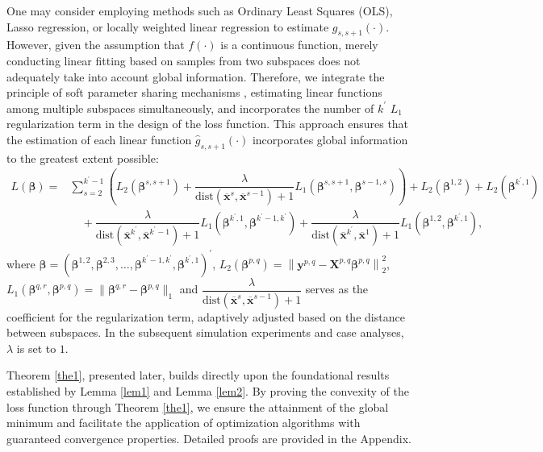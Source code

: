 \documentclass[final,3p,times]{elsarticle}
\begin{document}
One may consider employing methods such as Ordinary Least Squares 
(OLS), Lasso regression, or locally weighted linear regression to 
estimate $g_{s,s+1}(\cdot)$. 
However, given the assumption that $f(\cdot)$ is a continuous 
function, merely conducting linear fitting based on samples from 
two subspaces does not adequately take into account global 
information. Therefore, we integrate the principle of soft 
parameter sharing mechanisms \cite{bib70}, estimating linear functions 
among multiple subspaces simultaneously, and incorporates the number of $k^\prime$ 
$L_1$ regularization term in the design of the loss function. This approach ensures that the estimation of each linear function 
$\hat{g}_{s,s+1}(\cdot)$ incorporates global information to the 
greatest extent possible:
\begin{equation} 
\label{eq8}
\begin{aligned}
L(\boldsymbol{\beta})=
&\sum\limits_{s=2}^{k^\prime-1}
\left(L_2(\boldsymbol{\beta}^{s,s+1})+\dfrac{\lambda}
{\text{dist}(\overline{\boldsymbol{x}}^{s},
\overline{\boldsymbol{x}}^{s-1})+1} 
L_1(\boldsymbol
{\beta}^{s,s+1},\boldsymbol{\beta}^{s-1,s}) \right) 
+L_2(\boldsymbol{\beta}^{1,2})+L_2(\boldsymbol{\beta}
^{k^\prime,1}) \\
&\quad+\dfrac{\lambda}{\text{dist}(
  \overline{\boldsymbol{x}}^{k^\prime},\overline
  {\boldsymbol{x}}^{k^\prime-1})+1}L_1(\boldsymbol{\beta}^{k^\prime,1},
  \boldsymbol{\beta}^{k^\prime-1,k^\prime})+\dfrac{\lambda}{\text{dist}(
\overline{\boldsymbol{x}}^{k^\prime},\overline
{\boldsymbol{x}}^{1})+1}L_1(\boldsymbol{\beta}^{1,2},
\boldsymbol{\beta}^{k^\prime,1}), 
\end{aligned}
\end{equation}
where $\boldsymbol{\beta}=\left(\boldsymbol{\beta}
^{1,2},\boldsymbol{\beta}^{2,3},\ldots,\boldsymbol
{\beta}^{k^\prime-1,k^\prime},\boldsymbol{\beta}^
{k^\prime,1}\right)^\prime$, $L_2(\boldsymbol{\beta}
^{p,q})=\left\|\boldsymbol{y}^{p, q}-\boldsymbol{X}^{p, q} 
\boldsymbol{\beta}^{p, q}\right\|_{2}^{2}$, 
$L_1(\boldsymbol{\beta}^{q,r},\boldsymbol{\beta}^
{p,q})=\|\boldsymbol{\beta}^{q,r}-\boldsymbol{\beta}
^{p,q}\|_1$ and $\dfrac{\lambda}{\text{dist}(
\overline{\boldsymbol{x}}^{s},\overline{\boldsymbol{x}}
^{s-1})+1}$ serves as the coefficient for the 
regularization term, adaptively adjusted based on 
the distance between subspaces. In the subsequent 
simulation experiments and case analyses, $\lambda$ 
is set to $1$.

Theorem \ref{the1}, presented later, builds directly upon the 
foundational results established by Lemma \ref{lem1} and 
Lemma \ref{lem2}. By proving the convexity of the loss 
function through Theorem \ref{the1}, we ensure the attainment 
of the global minimum and facilitate the application 
of optimization algorithms with guaranteed convergence 
properties. Detailed proofs are provided in the 
Appendix.
\end{document}
